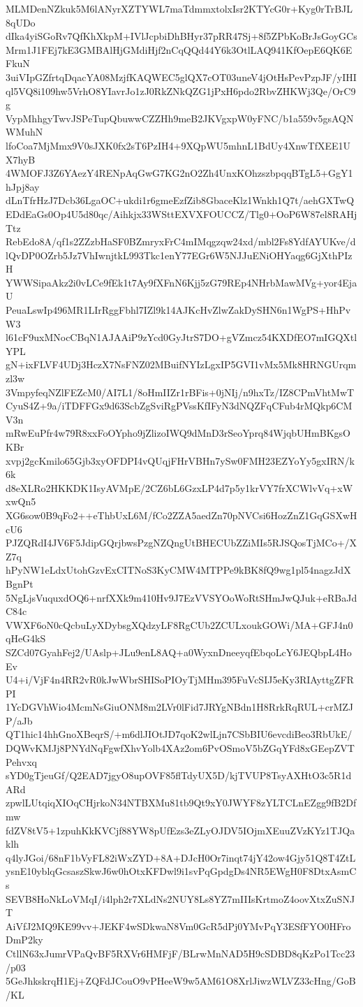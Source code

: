 MLMDenNZkuk5M6lANyrXZTYWL7maTdmmxtolxIsr2KTYcG0r+Kyg0rTrBJL8qUDo
dIka4yiSGoRv7QfKhXkpM+IVlJcpbiDhBHyr37pRR47Sj+8f5ZPbKoBrJsGoyGCs
Mrm1J1FEj7kE3GMBAlHjGMdiHjf2nCqQQd44Y6k3OtlLAQ941KfOepE6QK6EFkuN
3uiVIpGZfrtqDqacYA08MzjfKAQWEC5glQX7cOT03uneV4jOtHsPevPzpJF/yIHI
ql5VQ8i109hw5VrhO8YIavrJo1zJ0RkZNkQZG1jPxH6pdo2RbvZHKWj3Qe/OrC9g
VypMhhgyTwvJSPeTupQbuwwCZZHh9meB2JKVgxpW0yFNC/b1a559v5gsAQNWMuhN
lfoCoa7MjMmx9V0sJXK0fx2sT6PzIH4+9XQpWU5mhnL1BdUy4XnwTfXEE1UX7hyB
4WMOFJ3Z6YAezY4RENpAqGwG7KG2nO2Zh4UnxKOhzszbpqqBTgL5+GgY1hJpj8ay
dLnTfrHzJ7Dcb36LgaOC+ukdi1r6gmeEzfZib8GbaceKlz1Wnkh1Q7t/aehGXTwQ
EDdEaGs0Op4U5d80qc/Aihkjx33WSttEXVXFOUCCZ/Tlg0+OoP6W87el8RAHjTtz
RebEdo8A/qf1s2ZZzbHaSF0BZmryxFrC4mIMqgzqw24xd/mbl2Fs8YdfAYUKve/d
lQvDP0OZrb5Jz7VhIwnjtkL993Tkc1enY77EGr6W5NJJuENiOHYaqg6GjXthPIzH
YWWSipaAkz2i0vLCe9fEk1t7Ay9fXFnN6Kjj5zG79REp4NHrbMawMVg+yor4EjaU
PeuaLswIp496MR1LIrRggFbhl7IZl9k14AJKcHvZlwZakDySHN6n1WgPS+HhPvW3
l61cF9uxMNocCBqN1AJAAiP9zYcd0GyJtrS7DO+gVZmcz54KXDfEO7mIGQXtlYPL
gN+ixFLVF4UDj3HczX7NsFNZ02MBuifNYIzLgxIP5GVI1vMx5Mk8HRNGUrqmzl3w
3VmpyfeqNZlFEZcM0/AI7L1/8oHmIIZr1rBFis+0jNIj/n9hxTz/IZ8CPmVhtMwT
CyuS4Z+9a/iTDFFGx9d63ScbZgSviRgPVssKfIFyN3dNQZFqCFub4rMQkp6CMV3n
mRwEuPfr4w79R8xxFoOYpho9jZlizoIWQ9dMnD3rSeoYprq84WjqbUHmBKgsOKBr
xvpj2gcKmilo65Gjb3xyOFDPI4vQUqjFHrVBHn7ySw0FMH23EZYoYy5gxIRN/k6k
d8eXLRo2HKKDK1IsyAVMpE/2CZ6bL6GzxLP4d7p5y1krVY7frXCWlvVq+xWxwQn5
XG6sow0B9qFo2++eThbUxL6M/fCo2ZZA5aedZn70pNVCsi6HozZnZ1GqGSXwHcU6
PJZQRdI4JV6F5JdipGQrjbwsPzgNZQngUtBHECUbZZiMIs5RJSQosTjMCo+/XZ7q
hPyNW1eLdxUtohGzvExCITNoS3KyCMW4MTPPe9kBK8fQ9wg1pl54nagzJdXBgnPt
5NgLjsVuquxdOQ6+nrfXXk9m410Hv9J7EzVVSYOoWoRtSHmJwQJuk+eRBaJdC84c
VWXF6oN0cQcbuLyXDybsgXQdzyLF8RgCUb2ZCULxoukGOWi/MA+GFJ4n0qHeG4kS
SZCd07GyahFej2/UAslp+JLu9enL8AQ+a0WyxnDneeyqfEbqoLcY6JEQbpL4HoEv
U4+i/VjF4n4RR2vR0kJwWbrSHISoPIOyTjMHm395FuVcSIJ5eKy3RIAyttgZFRPI
1YcDGVhWio4McmNsGiuONM8m2LVr0lFid7JRYgNBdn1H8RrkRqRUL+crMZJP/aJb
QT1hic14hhGnoXBeqrS/+m6dlJIOtJD7qoK2wlLjn7CSbBIU6evcdiBeo3RbUkE/
DQWvKMJj8PNYdNqFgwfXhvYolb4XAz2om6PvOSmoV5bZGqYFd8xGEepZVTPehvxq
sYD0gTjeuGf/Q2EAD7jgyO8upOVF85flTdyUX5D/kjTVUP8TsyAXHtO3c5R1dARd
zpwlLUtqiqXIOqCHjrkoN34NTBXMu81tb9Qt9xY0JWYF8zYLTCLnEZgg9fB2Dfmw
fdZV8tV5+1zpuhKkKVCjf88YW8pUfEzs3eZLyOJDV5IOjmXEuuZVzKYz1TJQaklh
q4lyJGoi/68nF1bVyFL82iWxZYD+8A+DJcH0Or7inqt74jY42ow4Gjy51Q8T4ZtL
ysnE10yblqGcsaszSkwJ6w0hOtxKFDwl9i1svPqGpdgDs4NR5EWgH0F8DtxAsmCs
SEVB8HoNkLoVMqI/i4lph2r7XLdNs2NUY8Ls8YZ7mIIIsKrtmoZ4oovXtxZuSNJT
AiVfJ2MQ9KE99vv+JEKF4wSDkwaN8Vm0GcR5dPj0YMvPqY3ESfFYO0HFroDmP2ky
CtllN63xJumrVPaQvBF5RXVr6HMFjF/BLrwMnNAD5H9cSDBD8qKzPo1Tcc23/p03
5GeJhkskrqH1Ej+ZQFdJCouO9vPHeeW9w5AM61O8XrlJiwzWLVZ33cHng/GoB/KL
